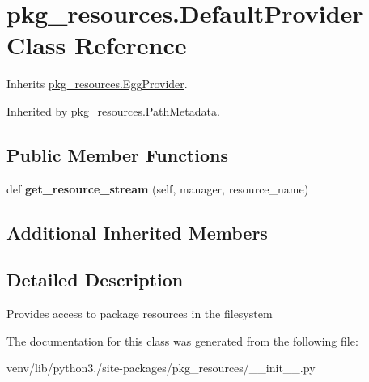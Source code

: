 \hypertarget{classpkg__resources_1_1_default_provider}{}\section{pkg\+\_\+resources.\+Default\+Provider Class Reference}
\label{classpkg__resources_1_1_default_provider}


Inherits \hyperlink{classpkg__resources_1_1_egg_provider}{pkg\+\_\+resources.\+Egg\+Provider}.



Inherited by \hyperlink{classpkg__resources_1_1_path_metadata}{pkg\+\_\+resources.\+Path\+Metadata}.

\subsection*{Public Member Functions}
\begin{DoxyCompactItemize}
\item 
\mbox{\label{classpkg__resources_1_1_default_provider_aeb33e951bb17171389d443d9540e3201}} 
def {\bfseries get\+\_\+resource\+\_\+stream} (self, manager, resource\+\_\+name)
\end{DoxyCompactItemize}
\subsection*{Additional Inherited Members}


\subsection{Detailed Description}
\begin{DoxyVerb}Provides access to package resources in the filesystem\end{DoxyVerb}
 

The documentation for this class was generated from the following file\+:\begin{DoxyCompactItemize}
\item 
venv/lib/python3./site-\/packages/pkg\+\_\+resources/\+\_\+\+\_\+init\+\_\+\+\_\+.\+py\end{DoxyCompactItemize}
